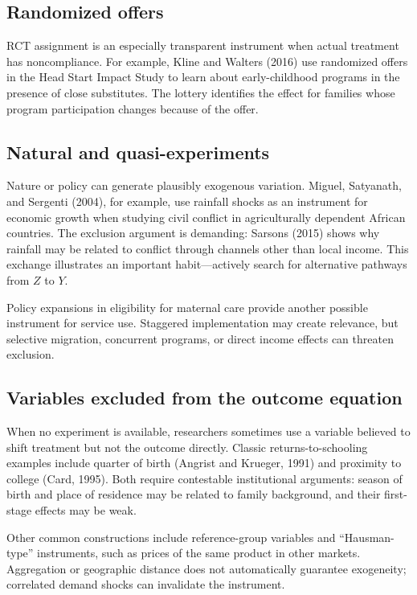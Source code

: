 \subsection{Randomized offers}

RCT assignment is an especially transparent instrument when actual treatment
has noncompliance.  For example, Kline and Walters (2016) use randomized offers
in the Head Start Impact Study to learn about early-childhood programs in the
presence of close substitutes.  The lottery identifies the effect for families
whose program participation changes because of the offer.

\subsection{Natural and quasi-experiments}

Nature or policy can generate plausibly exogenous variation.  Miguel, Satyanath,
and Sergenti (2004), for example, use rainfall shocks as an instrument for
economic growth when studying civil conflict in agriculturally dependent
African countries.  The exclusion argument is demanding: Sarsons (2015) shows
why rainfall may be related to conflict through channels other than local
income.  This exchange illustrates an important habit---actively search for
alternative pathways from $Z$ to $Y$.

Policy expansions in eligibility for maternal care provide another possible
instrument for service use.  Staggered implementation may create relevance,
but selective migration, concurrent programs, or direct income effects can
threaten exclusion.

\subsection{Variables excluded from the outcome equation}

When no experiment is available, researchers sometimes use a variable believed
to shift treatment but not the outcome directly.  Classic returns-to-schooling
examples include quarter of birth (Angrist and Krueger, 1991) and proximity to
college (Card, 1995).  Both require contestable institutional arguments:
season of birth and place of residence may be related to family background,
and their first-stage effects may be weak.

Other common constructions include reference-group variables and
``Hausman-type'' instruments, such as prices of the same product in other
markets.  Aggregation or geographic distance does not automatically guarantee
exogeneity; correlated demand shocks can invalidate the instrument.

